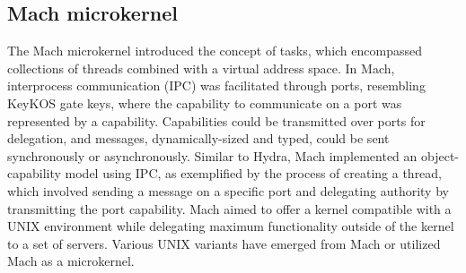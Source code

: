\subsection{Mach microkernel}
The Mach microkernel\cite{rashid_mach_nodate} introduced the concept of tasks, which encompassed collections of threads 
combined with a virtual address space. In Mach, interprocess communication (IPC) was facilitated through 
ports, resembling KeyKOS gate keys, where the capability to communicate on a port was represented by a 
capability. Capabilities could be transmitted over ports for delegation, and messages, dynamically-sized 
and typed, could be sent synchronously or asynchronously. Similar to Hydra, Mach implemented an object-capability 
model using IPC, as exemplified by the process of creating a thread, which involved sending a message on a specific 
port and delegating authority by transmitting the port capability. Mach aimed to offer a kernel compatible with a 
UNIX environment while delegating maximum functionality outside of the kernel to a set of servers. Various 
UNIX variants have emerged from Mach or utilized Mach as a microkernel.
\newline

